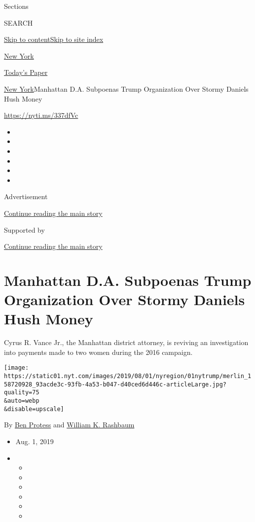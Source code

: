 Sections

SEARCH

\protect\hyperlink{site-content}{Skip to
content}\protect\hyperlink{site-index}{Skip to site index}

\href{https://www.nytimes.com/section/nyregion}{New York}

\href{https://myaccount.nytimes.com/auth/login?response_type=cookie\&client_id=vi}{}

\href{https://www.nytimes.com/section/todayspaper}{Today's Paper}

\href{/section/nyregion}{New York}\textbar{}Manhattan D.A. Subpoenas
Trump Organization Over Stormy Daniels Hush Money

\url{https://nyti.ms/337dfVc}

\begin{itemize}
\item
\item
\item
\item
\item
\item
\end{itemize}

Advertisement

\protect\hyperlink{after-top}{Continue reading the main story}

Supported by

\protect\hyperlink{after-sponsor}{Continue reading the main story}

\hypertarget{manhattan-da-subpoenas-trump-organization-over-stormy-daniels-hush-money}{%
\section{Manhattan D.A. Subpoenas Trump Organization Over Stormy Daniels
Hush
Money}\label{manhattan-da-subpoenas-trump-organization-over-stormy-daniels-hush-money}}

Cyrus R. Vance Jr., the Manhattan district attorney, is reviving an
investigation into payments made to two women during the 2016 campaign.

\texttt{[image: https://static01.nyt.com/images/2019/08/01/nyregion/01nytrump/merlin\_158720928\_93acde3c-93fb-4a53-b047-d40ced6d446c-articleLarge.jpg?quality=75\\\&auto=webp\\\&disable=upscale]}

By \href{https://www.nytimes.com/by/ben-protess}{Ben Protess} and
\href{https://www.nytimes.com/by/william-k-rashbaum}{William K.
Rashbaum}

\begin{itemize}
\item
  Aug. 1, 2019
\item
  \begin{itemize}
  \item
  \item
  \item
  \item
  \item
  \item
  \end{itemize}
\end{itemize}

